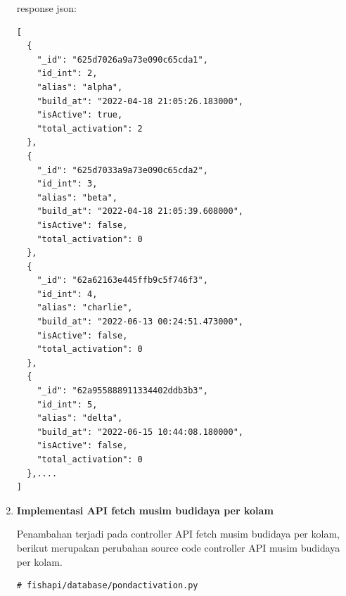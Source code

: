\begin{enumerate}[1.]
response json:
\begin{lstlisting}
[
  {
    "_id": "625d7026a9a73e090c65cda1",
    "id_int": 2,
    "alias": "alpha",
    "build_at": "2022-04-18 21:05:26.183000",
    "isActive": true,
    "total_activation": 2
  },
  {
    "_id": "625d7033a9a73e090c65cda2",
    "id_int": 3,
    "alias": "beta",
    "build_at": "2022-04-18 21:05:39.608000",
    "isActive": false,
    "total_activation": 0
  },
  {
    "_id": "62a62163e445ffb9c5f746f3",
    "id_int": 4,
    "alias": "charlie",
    "build_at": "2022-06-13 00:24:51.473000",
    "isActive": false,
    "total_activation": 0
  },
  {
    "_id": "62a955888911334402ddb3b3",
    "id_int": 5,
    "alias": "delta",
    "build_at": "2022-06-15 10:44:08.180000",
    "isActive": false,
    "total_activation": 0
  },....
]
\end{lstlisting}



\item \textbf{Implementasi API fetch musim budidaya per kolam}

Penambahan terjadi pada controller API fetch musim budidaya per kolam, berikut merupakan perubahan source code controller API musim budidaya per kolam.

\begin{lstlisting}
# fishapi/database/pondactivation.py


\end{lstlisting}
\end{enumerate}

